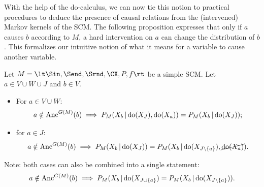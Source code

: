 With the help of the do-calculus, we can now tie this notion to practical procedures 
to deduce the presence of causal relations from the (intervened) Markov kernels of the SCM.
The following proposition expresses that only if $a$ causes $b$ according to $M$, a
hard intervention on $a$ can change the distribution of $b$. 
This formalizes our intuitive notion of what it means for a variable to cause another variable.
\begin{Prp}\label{prp:scm_causes_separation}
  Let $M = \lt \Sin, \Send, \Srnd, \CX, P, f \rt$ be a simple SCM.
  Let $a \in V \cup W \cup J$ and $b \in V$.
  \begin{itemize}
    \item For $a \in V \cup W$:
      $$a \notin \mathrm{Anc}^{G(M)}(b) \implies P_{M}(X_b \operatorname*{|} \operatorname{do}(X_J), \operatorname{do}(X_a)) = P_{M}(X_b \operatorname*{|} \operatorname{do}(X_J));$$
    \item for $a \in J$:
      $$a \notin \mathrm{Anc}^{G(M)}(b) \implies P_{M}(X_b \operatorname*{|} \operatorname{do}(X_J)) = P_{M}(X_b \operatorname*{|} \operatorname{do}(X_{J\setminus \{a\}}),\cancel{\operatorname{do}(X_a)}).$$
  \end{itemize}
  Note: both cases can also be combined into a single statement:
    $$a \notin \mathrm{Anc}^{G(M)}(b) \implies P_{M}(X_b \operatorname*{|} \operatorname{do}(X_{J \cup \{a\}}) = P_{M}(X_b \operatorname*{|} \operatorname{do}(X_{J\setminus\{a\}})).$$
\end{Prp}
